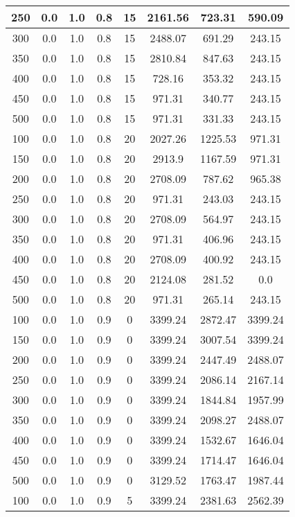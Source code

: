 \documentclass[a4paper, 12pt]{extreport}
\begin{document}
\begin{itemize}
\begin{longtable}{|c|c|c|c|c|c|c|c|}
			250 & 0.0 & 1.0 & 0.8 & 15 & 2161.56 & 723.31 & 590.09 \\\hline
			300 & 0.0 & 1.0 & 0.8 & 15 & 2488.07 & 691.29 & 243.15 \\\hline
			350 & 0.0 & 1.0 & 0.8 & 15 & 2810.84 & 847.63 & 243.15 \\\hline
			400 & 0.0 & 1.0 & 0.8 & 15 & 728.16 & 353.32 & 243.15 \\\hline
			450 & 0.0 & 1.0 & 0.8 & 15 & 971.31 & 340.77 & 243.15 \\\hline
			500 & 0.0 & 1.0 & 0.8 & 15 & 971.31 & 331.33 & 243.15 \\\hline
			100 & 0.0 & 1.0 & 0.8 & 20 & 2027.26 & 1225.53 & 971.31 \\\hline
			150 & 0.0 & 1.0 & 0.8 & 20 & 2913.9 & 1167.59 & 971.31 \\\hline
			200 & 0.0 & 1.0 & 0.8 & 20 & 2708.09 & 787.62 & 965.38 \\\hline
			250 & 0.0 & 1.0 & 0.8 & 20 & 971.31 & 243.03 & 243.15 \\\hline
			300 & 0.0 & 1.0 & 0.8 & 20 & 2708.09 & 564.97 & 243.15 \\\hline
			350 & 0.0 & 1.0 & 0.8 & 20 & 971.31 & 406.96 & 243.15 \\\hline
			400 & 0.0 & 1.0 & 0.8 & 20 & 2708.09 & 400.92 & 243.15 \\\hline
			450 & 0.0 & 1.0 & 0.8 & 20 & 2124.08 & 281.52 & 0.0 \\\hline
			500 & 0.0 & 1.0 & 0.8 & 20 & 971.31 & 265.14 & 243.15 \\\hline
			100 & 0.0 & 1.0 & 0.9 & 0 & 3399.24 & 2872.47 & 3399.24 \\\hline
			150 & 0.0 & 1.0 & 0.9 & 0 & 3399.24 & 3007.54 & 3399.24 \\\hline
			200 & 0.0 & 1.0 & 0.9 & 0 & 3399.24 & 2447.49 & 2488.07 \\\hline
			250 & 0.0 & 1.0 & 0.9 & 0 & 3399.24 & 2086.14 & 2167.14 \\\hline
			300 & 0.0 & 1.0 & 0.9 & 0 & 3399.24 & 1844.84 & 1957.99 \\\hline
			350 & 0.0 & 1.0 & 0.9 & 0 & 3399.24 & 2098.27 & 2488.07 \\\hline
			400 & 0.0 & 1.0 & 0.9 & 0 & 3399.24 & 1532.67 & 1646.04 \\\hline
			450 & 0.0 & 1.0 & 0.9 & 0 & 3399.24 & 1714.47 & 1646.04 \\\hline
			500 & 0.0 & 1.0 & 0.9 & 0 & 3129.52 & 1763.47 & 1987.44 \\\hline
			100 & 0.0 & 1.0 & 0.9 & 5 & 3399.24 & 2381.63 & 2562.39 \\\hline

\end{longtable}
\end{itemize}
\end{document}
